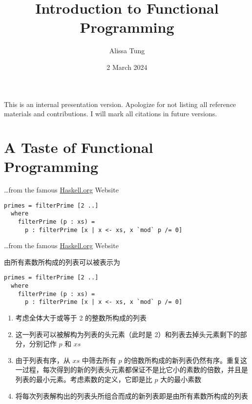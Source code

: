 \documentclass{beamer}
\title{Introduction to Functional Programming}
\author{Alissa Tung}
\date{2 March 2024}
\begin{document}
\maketitle

\begin{frame}
This is an internal presentation version.
Apologize for not listing all reference materials and contributions. I will mark all citations in future versions.
\end{frame}

\begin{frame}
\tableofcontents[sectionstyle=show,subsectionstyle=show/shaded/hide,subsubsectionstyle=show/shaded/hide]
\end{frame}

\section{A Taste of Functional Programming}

\begin{frame}[fragile]{\ldots from the famous \url{Haskell.org} Website}
\begin{verbatim}
primes = filterPrime [2 ..]
  where
    filterPrime (p : xs) =
      p : filterPrime [x | x <- xs, x `mod` p /= 0]
\end{verbatim}
\end{frame}

\begin{frame}[fragile]{\ldots from the famous \url{Haskell.org} Website}

由所有素数所构成的列表可以被表示为

\begin{verbatim}
primes = filterPrime [2 ..]
  where
    filterPrime (p : xs) =
      p : filterPrime [x | x <- xs, x `mod` p /= 0]
\end{verbatim}

\begin{enumerate}
\item 考虑全体大于或等于 2 的整数所构成的列表
\pause\item 这一列表可以被解构为列表的头元素（此时是 2）和列表去掉头元素剩下的部分，分别记作 $p$ 和 $xs$
\pause\item 由于列表有序，从 $xs$ 中筛去所有 $p$ 的倍数所构成的新列表仍然有序。重复这一过程，每次得到的新的列表头元素都保证不是比它小的素数的倍数，并且是列表的最小元素。考虑素数的定义，它即是比 $p$ 大的最小素数
\pause\item 将每次列表解构出的列表头所组合而成的新列表即是由所有素数所构成的列表
\end{enumerate}

\end{frame}
\end{document}
